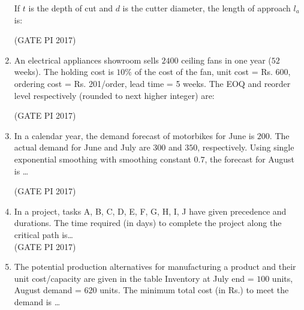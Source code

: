 \documentclass[journal,12pt,onecolumn]{IEEEtran}
\theoremstyle{remark}
\begin{document}
\begin{enumerate}
If $t$ is the depth of cut and $d$ is the cutter diameter, the length of approach $l_a$ is:
\begin{enumerate}
\end{enumerate}
\hfill (GATE PI 2017)

\item An electrical appliances showroom sells $2400$ ceiling fans in one year ($52$ weeks).  
The holding cost is $10\%$ of the cost of the fan, unit cost = Rs. 600, ordering cost = Rs. 201/order, lead time = 5 weeks.  
The EOQ and reorder level respectively (rounded to next higher integer) are:
\begin{enumerate}
\end{enumerate}
\hfill (GATE PI 2017)

\item In a calendar year, the demand forecast of motorbikes for June is $200$.  
The actual demand for June and July are $300$ and $350$, respectively.  
Using single exponential smoothing with smoothing constant $0.7$, the forecast for August is \dots

\hfill (GATE PI 2017)

\item In a project, tasks A, B, C, D, E, F, G, H, I, J have given precedence and durations.  
The time required (in days) to complete the project along the critical path is\dots \\


 
\hfill (GATE PI 2017)

\item The potential production alternatives for manufacturing a product and their unit cost/capacity are given in the table 
Inventory at July end = $100$ units, August demand = $620$ units.  
The minimum total cost (in Rs.) to meet the demand is \dots\\


\end{enumerate}
\end{document}
